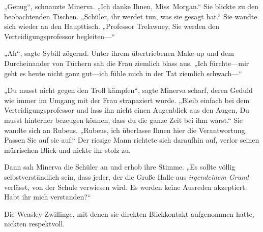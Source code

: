 „Genug“, schnauzte Minerva.
„Ich danke Ihnen, Miss~Morgan.“ Sie blickte zu den beobachtenden Tischen.
„Schüler, ihr werdet tun, was sie gesagt hat.“ Sie wandte sich wieder an den Haupttisch.
„Professor Trelawney, Sie werden den Verteidigungsprofessor begleiten—“

„Ah“, sagte Sybill zögernd. Unter ihrem übertriebenen Make-up und dem Durcheinander von Tüchern sah die Frau ziemlich blass aus.
„Ich fürchte—mir geht es heute nicht ganz gut—ich fühle mich in der Tat ziemlich schwach—“

„Du musst nicht gegen den Troll kämpfen“, sagte Minerva scharf, deren Geduld wie immer im Umgang mit der Frau strapaziert wurde.
„Bleib einfach bei dem Verteidigungsprofessor und lass ihn nicht einen Augenblick aus den Augen, Du musst hinterher bezeugen können, dass du die ganze Zeit bei ihm warst.“ Sie wandte sich an Rubeus.
„Rubeus, ich überlasse Ihnen hier die Verantwortung. Passen Sie auf sie auf.“
Der riesige Mann richtete sich daraufhin auf, verlor seinen mürrischen Blick und nickte ihr stolz zu.

Dann sah Minerva die Schüler an und erhob ihre Stimme.
„Es sollte völlig selbstverständlich sein, dass jeder, der die Große Halle aus \emph{irgendeinem Grund} verlässt, von der Schule verwiesen wird. Es werden keine Ausreden akzeptiert. Habt ihr mich verstanden?“

Die Weasley-Zwillinge, mit denen sie direkten Blickkontakt aufgenommen hatte, nickten respektvoll.

